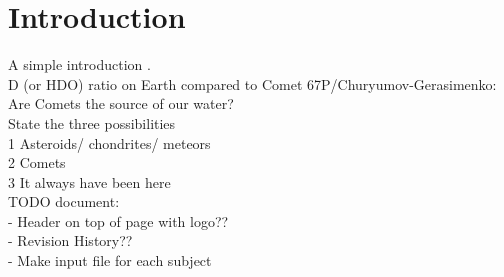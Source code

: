 
\section{Introduction}
A simple introduction \cite[p.~199]{nobody}.\\

D (or HDO) ratio on Earth compared to Comet 67P/Churyumov-Gerasimenko: Are Comets the source of our water?\\

State the three possibilities \\
	1 Asteroids/ chondrites/ meteors\\
	2 Comets\\
	3 It always have been here\\

TODO document:\\
- Header on top of page with logo??\\
- Revision History??\\
- Make input file for each subject\\